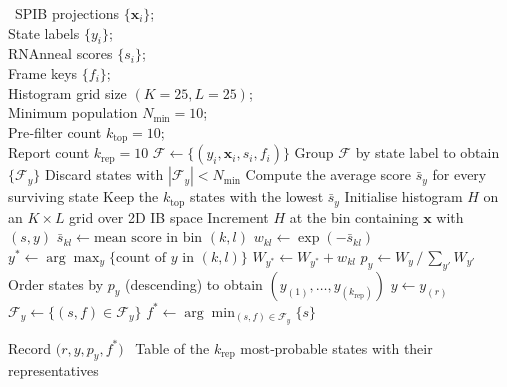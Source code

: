 \begin{algorithm}[H]
  \caption{Boltzmann‑weighted state ranking and representative selection}
  \label{ch6:alg:state-ranking}
  \begin{algorithmic}[1]
    \REQUIRE\ SPIB projections $\{\mathbf{x}_{i}\}$;\\
    State labels $\{y_{i}\}$;\\
    RNAnneal scores $\{s_{i}\}$;\\ Frame keys $\{f_{i}\}$;\\ Histogram grid size $(K=25,L=25)$;\\ Minimum population $N_{\min}=10$;\\ Pre‑filter count $k_{\mathrm{top}}=10$;\\ Report count $k_{\mathrm{rep}}=10$
    \STATE $\mathcal{F}\!\leftarrow\!\{(y_{i},\mathbf{x}_{i},s_{i},f_{i})\}$
    \STATE Group $\mathcal{F}$ by state label to obtain $\{\mathcal{F}_y\}$
    \STATE Discard states with $|\mathcal{F}_y|<N_{\min}$
    \STATE Compute the average score $\bar{s}_y $ for every surviving state
    \STATE Keep the $k_{\mathrm{top}}$ states with the lowest $\bar{s}_y$
    \STATE Initialise histogram $H$ on an $K\times L$ grid over 2D IB space
      \STATE Increment $H$ at the bin containing $\mathbf{x}$ with $(s,y)$
    \ENDFOR
      \STATE $\bar{s}_{kl}\!\leftarrow\!\text{mean score in bin }(k,l)$
      \STATE $w_{kl}\!\leftarrow\!\exp(-\bar{s}_{kl})$ 
      \STATE $y^\ast\!\leftarrow\!\arg\max_y\{\text{count of }y\text{ in }(k,l)\}$ 
      \STATE $W_{y^\ast}\!\leftarrow\!W_{y^\ast}+w_{kl}$ 
    \ENDFOR
    \STATE $p_y\!\leftarrow\!W_y\,/\,\sum_{y'}W_{y'}$ 
    \STATE Order states by $p_y$ (descending) to obtain $(y_{(1)},\dots,y_{(k_{\mathrm{rep}})})$
      \STATE $y\!\leftarrow\!y_{(r)}$
      \STATE $\mathcal{F}_y\!\leftarrow\!\{(s,f)\in\mathcal{F}_y\}$
      \STATE $f^\ast\!\leftarrow\!\arg\min_{(s,f)\in\mathcal{F}_y}\{s\}$ 

      \STATE Record $\bigl(r,y,p_y,f^\ast\bigr)$
    \ENDFOR
    \RETURN\ Table of the $k_{\mathrm{rep}}$ most‑probable states with their representatives
  \end{algorithmic}
\end{algorithm}
